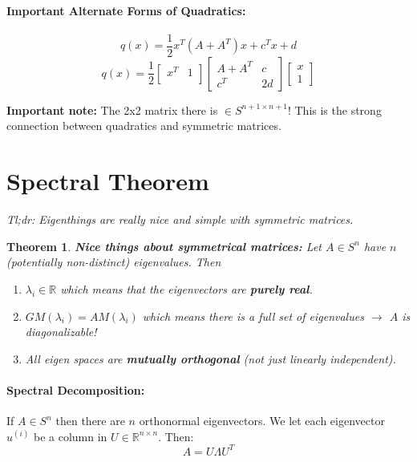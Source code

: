 \documentclass[a4paper,12pt]{report}
\def\reals{\mathbb{R}}
\newtheorem{theorem}{Theorem}
\begin{document}
\paragraph{Important Alternate Forms of Quadratics: } 
\begin{equation}
q(x) = \frac{1}{2}x^T(A+A^T)x + c^T x + d
\end{equation}
\begin{equation}
q(x) = \frac{1}{2}
\begin{bmatrix}
	x^T & 1 \\
\end{bmatrix}
\begin{bmatrix}
	A+A^T & c \\
	c^T & 2d
\end{bmatrix}
\begin{bmatrix}
	x \\
	1 
\end{bmatrix}
\end{equation}

\textbf{Important note: } The 2x2 matrix there is $\in S^{n+1\times n+1}$! This is the strong connection between quadratics and symmetric matrices.

\section{Spectral Theorem}

\textit{Tl;dr: Eigenthings are really nice and simple with symmetric matrices.} 

\begin{theorem}
\textbf{Nice things about symmetrical matrices: } 
Let $A\in S^n$ have $n$ (potentially non-distinct) eigenvalues. Then
\begin{enumerate}
\item $\lambda_i \in \reals$ which means that the eigenvectors are \textbf{purely real}.
\item $GM(\lambda_i) = AM(\lambda_i)$ which means there is a full set of eigenvalues $\to$ $A$ is diagonalizable!
\item All eigen spaces are \textbf{mutually orthogonal} (not just linearly independent).
\end{enumerate}
\end{theorem}


\paragraph{Spectral Decomposition: } If $A\in S^n$ then there are $n$ orthonormal eigenvectors. We let each eigenvector $u^{(i)}$ be a column in $U\in \reals^{n\times n}$. Then: 
\begin{equation}
A = U\Lambda U^T
\end{equation}
\end{document}
